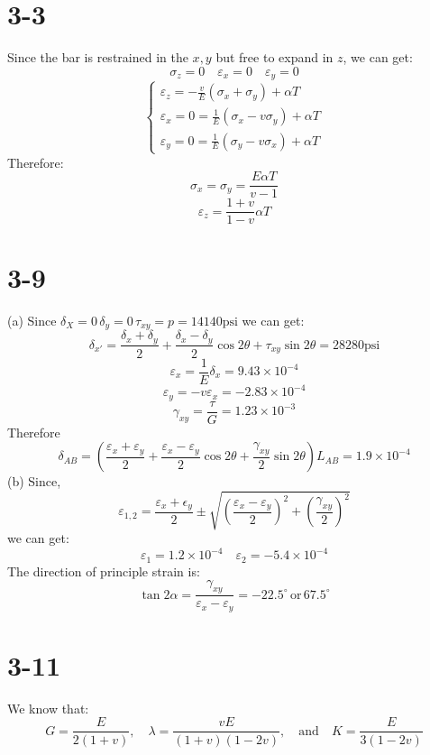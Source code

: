\documentclass[onecolumn,oneside]{SUSTechHomework}
\begin{document}
  \section*{3-3}
  Since the bar is restrained in the \(x,y\) but free to expand in \(z\), we can get:
  \[
    \sigma_z = 0 \quad \varepsilon_x = 0 \quad \varepsilon_y = 0
  \]
  \[
    \begin{cases}
      \varepsilon_z = -\frac{v}{E}(\sigma_x+\sigma_y)+\alpha T \\
      \varepsilon_x = 0 = \frac{1}{E}(\sigma_x - v\sigma_y)+\alpha T\\
      \varepsilon_y = 0 = \frac{1}{E}(\sigma_y - v\sigma_x)+\alpha T
    \end{cases}
  \]
  Therefore:
  \[
      \sigma_x = \sigma_y = \frac{E\alpha T}{v-1}
  \]
  \[
    \varepsilon_z = \frac{1+v}{1-v}\alpha T
  \]
  
  \section*{3-9}
  (a)\newline
  Since \(\delta_X = 0\, \delta_y = 0\, \tau_{xy} = p = 14140\text{psi}\) we can get:
  \[
  \delta_{x'} = \frac{\delta_x + \delta_y}{2} + \frac{\delta_x - \delta_y}{2}\cos 2\theta + \tau_{xy}\sin 2\theta = 28280\text{psi}
  \]
  \[
  \varepsilon_x = \frac{1}{E}\delta_x = 9.43\times10^{-4}
  \]
  \[
  \varepsilon_y = -v\varepsilon_x = -2.83\times10^{-4}
  \]
  \[
  \gamma_{xy} = \frac{\tau}{G} = 1.23\times10^{-3}
  \]
  Therefore
  \[
  \delta_{AB} = (\frac{\varepsilon_x+\varepsilon_y}{2} + \frac{\varepsilon_x-\varepsilon_y}{2}\cos 2\theta + \frac{\gamma_{xy}}{2}\sin 2\theta)L_{AB} = 1.9\times10^{-4}
  \]
  (b)\newline
  Since,
  \[
  \varepsilon_{1,2} = \frac{\varepsilon_x + \epsilon_y}{2} \pm \sqrt{\left( \frac{\varepsilon_x - \varepsilon_y}{2} \right)^2 + \left( \frac{\gamma_{xy}}{2} \right)^2}
  \]
  we can get:
  \[
  \varepsilon_1 = 1.2\times10^{-4} \quad \varepsilon_2 = -5.4\times10^{-4}
  \]
  The direction of principle strain is:
  \[
    \tan 2\alpha = \frac{\gamma_{xy}}{\varepsilon_x - \varepsilon_y} = -22.5^\circ\, \text{or}\, 67.5^\circ
  \]
  \section*{3-11}
  We know that:
  \[
  G = \frac{E}{2(1+v)}, \quad \lambda = \frac{vE}{(1+v)(1-2v)}, \quad \text{and} \quad K = \frac{E}{3(1-2v)}
  \]
\end{document}
